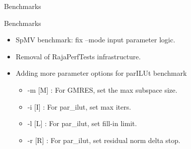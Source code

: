 \begin{frame}[fragile]

  {\Huge Benchmarks}

  \vspace{10pt}

\end{frame}

\begin{frame}[fragile]{Benchmarks}
  \begin{itemize}
  \item SpMV benchmark: fix {\ttfamily --mode} input parameter logic.
  \item Removal of RajaPerfTests infrastructure.
  \item Adding more parameter options for parILUt benchmark
    \begin{itemize}
    \item {\ttfamily-m [M]} : For GMRES, set the max subspace size.
    \item {\ttfamily-i [I]} : For par\_ilut, set max iters.
    \item {\ttfamily-l [L]} : For par\_ilut, set fill-in limit.
    \item {\ttfamily-r [R]} : For par\_ilut, set residual norm delta stop.
    \end{itemize}
  \end{itemize}
\end{frame}
